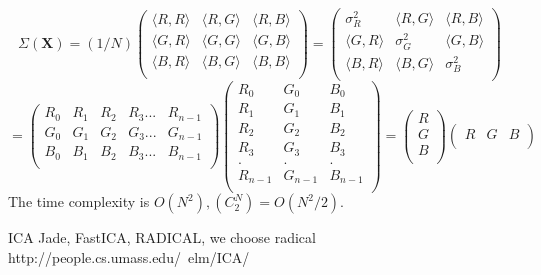 \documentclass[a4paper,12pt]{article}
\begin{document}
\begin{compactitem}
\[
\Sigma(\textbf{X})=(1/N)
\begin{pmatrix}
       \langle R, R \rangle	& \langle R, G \rangle 	& \langle R, B	\rangle \\[0.3em]
       \langle G, R \rangle 	& \langle G, G \rangle		& \langle G, B	\rangle \\[0.3em]
       \langle B, R \rangle	& \langle B, G \rangle 	& \langle B, B	\rangle	\\[0.3em]
\end{pmatrix}
=
\begin{pmatrix}
       \sigma_R^2              & \langle R, G \rangle 	&  \langle R, B	\rangle \\[0.3em]
       \langle G, R \rangle 	& \sigma_G^2	            & \langle G, B	\rangle \\[0.3em]
       \langle B, R \rangle	& \langle B, G \rangle 	& \sigma_B^2	\\[0.3em]
\end{pmatrix}
\]
\[
=
\begin{pmatrix}
       R_0 & R_1 & R_2 & R_3 ... & R_{n-1} \\[0.3em]
       G_0 & G_1 & G_2 & G_3 ... & G_{n-1} \\[0.3em]
       B_0 & B_1 & B_2 & B_3 ... & B_{n-1} \\[0.3em]
\end{pmatrix}
\begin{pmatrix}
       R_0     & G_0     & B_0\\[0.3em]
       R_1     & G_1     & B_1\\[0.3em]
       R_2     & G_2     & B_2\\[0.3em]
       R_3     & G_3     & B_3\\[0.3em]
		.      & .       & .  \\[0.3em]
       R_{n-1} & G_{n-1} & B_{n-1}\\[0.3em]
\end{pmatrix}
=
\begin{pmatrix}
       R \\[0.3em]
       G \\[0.3em]
       B \\[0.3em]
\end{pmatrix}
\begin{pmatrix}
       R & G & B\\[0.3em]
\end{pmatrix}
\]
The time complexity is $O(N^2),  (C_2^N) = O(N^2/2)$.

\item ICA 
Jade, FastICA, RADICAL, we choose radical
http://people.cs.umass.edu/~elm/ICA/
\cite{radical-ica} \cite{krishnaveni2005comparison}

\end{compactitem}
\end{document}

